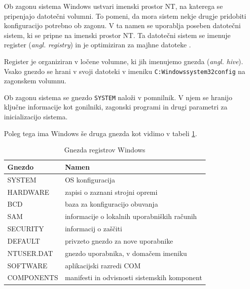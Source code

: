 \documentclass[a4paper,12pt,openright]{book}
\begin{document}
Ob zagonu sistema Windows ustvari imenski prostor NT, na katerega se pripenjajo datotečni volumni.
To pomeni, da mora sistem nekje drugje pridobiti konfiguracijo potrebno ob zagonu.
V ta namen se uporablja poseben datotečni sistem, ki se pripne na imenski prostor NT.
Ta datotečni sistem se imenuje register (\textit{angl. registry}) in je optimiziran za majhne datoteke \cite{Tanenbaum_Bos_2023}.

Register je organiziran v ločene volumne, ki jih imenujemo gnezda (\textit{angl. hive}).
Vsako gnezdo se hrani v svoji datoteki v imeniku \texttt{C:Windowssystem32config} na zagonskem volumnu.

Ob zagonu sistema se gnezdo \texttt{SYSTEM} naloži v pomnilnik.
V njem se hranijo ključne informacije kot gonilniki, zagonski programi in drugi parametri za inicializacijo sistema.

Poleg tega ima Windows še druga gnezda kot vidimo v tabeli \ref{tab:windows_registry_hives}.

\begin{table}[h!]
	\begin{center}
		\begin{tabular}{ p{3.7cm}|p{8.8cm} }
			Gnezdo     & Namen                                         \\
			\hline
			SYSTEM     & OS konfiguracija                              \\
			HARDWARE   & zapisi o zaznani strojni opremi               \\
			BCD        & baza za konfiguracijo obuvanja                \\
			SAM        & informacije o lokalnih uporabniških računih \\
			SECURITY   & informacij o zaščiti                        \\
			DEFAULT    & privzeto gnezdo za nove uporabnike            \\
			NTUSER.DAT & gnezdo uporabnika, v domačem imeniku         \\
			SOFTWARE   & aplikacijski razredi COM                      \\
			COMPONENTS & manifesti in odvisnosti sistemskih komponent  \\
		\end{tabular}
	\end{center}
	\caption{Gnezda registrov Windows \cite{Tanenbaum_Bos_2023}}
	\label{tab:windows_registry_hives}
\end{table}
\end{document}
